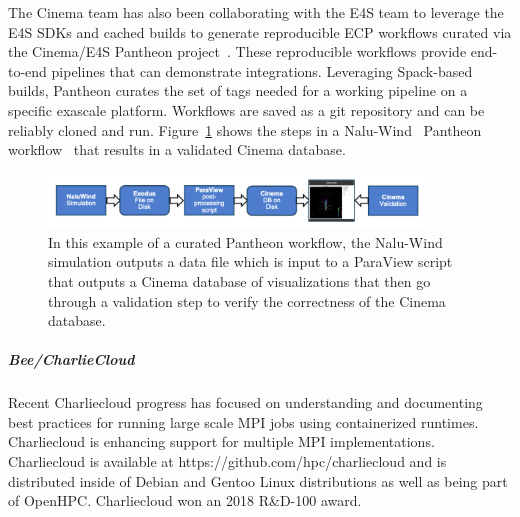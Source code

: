 The Cinema team has also been collaborating with the E4S team to leverage the E4S SDKs and cached builds to generate reproducible ECP workflows curated via the Cinema/E4S Pantheon project~\cite{pantheon:web}.   These reproducible workflows provide end-to-end pipelines that can demonstrate integrations.   Leveraging Spack-based builds, Pantheon curates the set of tags needed for a working pipeline on a specific exascale platform.  Workflows are saved as a git repository and can be reliably cloned and run.  Figure~\ref{fig:cinema-pantheon} shows the steps in a Nalu-Wind~\cite{naluwind:2020} Pantheon workflow~\cite{pantheon:naluwind} that results in a validated Cinema database.  


\begin{figure}[htb]
	\centering
	\includegraphics[width=0.9\textwidth]{projects/2.3.6-NNSA/2.3.6.01-LANL-ATDM/pantheon-workflow.png}
	\caption{
		In this example of a curated Pantheon workflow, the Nalu-Wind simulation outputs a data file which is input to a ParaView script that outputs a Cinema database of visualizations that then go through a validation step to verify the correctness of the Cinema database.  
		\label{fig:cinema-pantheon}
	}
\end{figure}


\subparagraph{Bee/CharlieCloud}
%
Recent Charliecloud progress has focused on understanding and documenting best
practices for running large scale MPI jobs using containerized runtimes.
Charliecloud is enhancing support for multiple MPI implementations.
Charliecloud is available at https://github.com/hpc/charliecloud and is
distributed inside of Debian and Gentoo Linux distributions as well as being
part of OpenHPC.  Charliecloud won an 2018 R\&D-100 award.

